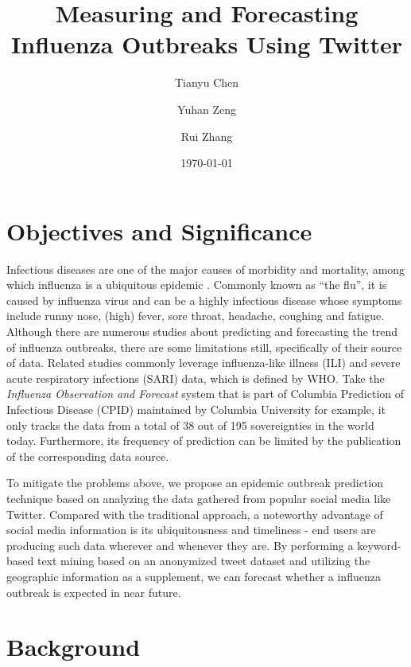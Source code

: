 \documentclass[12pt, oneside]{article}
\title{Measuring and Forecasting Influenza Outbreaks Using Twitter}
\author[1]{Tianyu Chen}
\author[2]{Yuhan Zeng}
\author[1]{Rui Zhang}
\affil[1]{Department of Computer Science, Indiana University}
\affil[2]{Department of Chemistry, Indiana University}
\affil[ ]{\textit{chen512@indiana.edu, \{rz20, yuhzeng\}@iu.edu}}
\date{\today}
\begin{document}
\maketitle



\section{Objectives and Significance}


Infectious diseases are one of the major causes of morbidity and mortality, among which influenza is a ubiquitous epidemic \cite{hickmann2015forecasting}.
Commonly known as ``the flu'', it is caused by influenza virus and can be a highly infectious disease whose symptoms include runny nose, (high) fever,
sore throat, headache, coughing and fatigue\cite{wiki:flu}. Although there are numerous studies about predicting and forecasting the trend of influenza outbreaks,
there are some limitations still, specifically of their source of data. Related studies commonly leverage influenza-like illness (ILI) and severe acute
respiratory infections (SARI) data, which is defined by WHO\cite{world2014global}. Take the \textit{Influenza Observation and Forecast} system that is part of
Columbia Prediction of Infectious Disease (CPID) maintained by Columbia University \cite{cpid} for example, it only tracks the data from a total of 38 out of
195 sovereignties in the world today. Furthermore, its frequency of prediction can be limited by the publication of the corresponding data source.

To mitigate the problems above, we propose an epidemic outbreak prediction technique based on analyzing the data gathered from popular social media
like Twitter. Compared with the traditional approach, a noteworthy advantage of social media information is its ubiquitousness and timeliness
- end users are producing such data wherever and whenever they are. By performing a keyword-based text mining based on an anonymized tweet dataset and utilizing
the geographic information as a supplement, we can forecast whether a influenza outbreak is expected in near future.


\section{Background}

\end{document}

